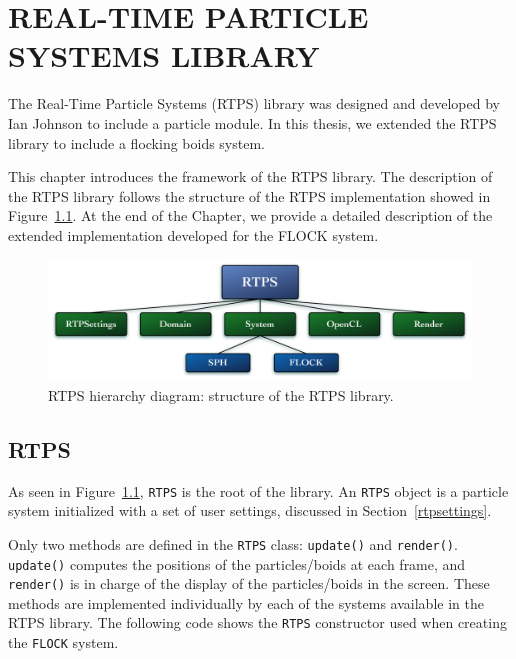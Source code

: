 \chapter{REAL-TIME PARTICLE SYSTEMS LIBRARY}\label{RTPSchapter}

The Real-Time Particle Systems (RTPS) library was designed and developed by Ian Johnson\cite{ianPaper} to include a particle module. In this thesis, we extended the RTPS library to include a flocking boids system. 

This chapter introduces the framework of the RTPS library. The description of the RTPS library follows the structure of the RTPS implementation showed in Figure~\ref{RTPSdiagram}. At the end of the Chapter, we provide a detailed description of the extended implementation developed for the FLOCK system.

\vspace{32pt}
\begin{figure}[htbp]
\begin{center}
\includegraphics[scale=0.38]{figures/RTPSdiagramMyrna.pdf}
\caption{RTPS hierarchy diagram: structure of the RTPS library.}
\label{RTPSdiagram}
\end{center}
\end{figure}

\section{RTPS}\label{rtpssection}
As seen in Figure~\ref{RTPSdiagram}, \texttt{RTPS} is the root of the library. An \texttt{RTPS} object is a particle system initialized with a set of user settings,  discussed in Section~\ref{rtpsettings}. 

Only two methods are defined in the \texttt{RTPS} class: \texttt{update()} and \texttt{render()}. \texttt{update()} computes the positions of the particles/boids at each frame, and \texttt{render()} is in charge of the display of the particles/boids in the screen. These methods are implemented individually by each of the systems available in the RTPS library. The following code shows the \texttt{RTPS} constructor used when creating the \texttt{FLOCK} system.

